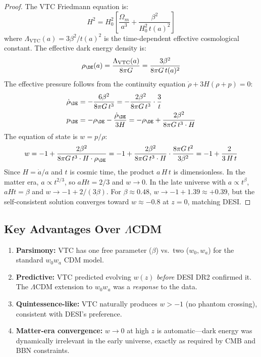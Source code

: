 \documentclass[11pt,a4paper]{article}
\theoremstyle{definition}
\newcommand{\VTC}{\mathrm{VTC}}
\begin{document}
\begin{proof}
The VTC Friedmann equation is:
\begin{equation}
H^2 = H_0^2\left[\frac{\Omega_m}{a^3} + \frac{\beta^2}{H_0^2\,t(a)^2}\right]
\end{equation}
where $\Lambda_\VTC(a) = 3\beta^2/t(a)^2$ is the time-dependent effective cosmological constant. The effective dark energy density is:
\begin{equation}
\rho_\DE(a) = \frac{\Lambda_\VTC(a)}{8\pi G} = \frac{3\beta^2}{8\pi G\,t(a)^2}
\end{equation}
The effective pressure follows from the continuity equation $\dot{\rho} + 3H(\rho + p) = 0$:
\begin{align}
\dot{\rho}_\DE &= -\frac{6\beta^2}{8\pi G\,t^3} = -\frac{2\beta^2}{8\pi G\,t^3}\cdot\frac{3}{t} \\
p_\DE &= -\rho_\DE - \frac{\dot{\rho}_\DE}{3H} = -\rho_\DE + \frac{2\beta^2}{8\pi G\,t^3\cdot H}
\end{align}
The equation of state is $w = p/\rho$:
\begin{equation}
w = -1 + \frac{2\beta^2}{8\pi G\,t^3 \cdot H \cdot \rho_\DE} = -1 + \frac{2\beta^2}{8\pi G\,t^3 \cdot H} \cdot \frac{8\pi G\,t^2}{3\beta^2} = -1 + \frac{2}{3\,H\,t}
\end{equation}
Since $H = \dot{a}/a$ and $t$ is cosmic time, the product $a\,H\,t$ is dimensionless. In the matter era, $a \propto t^{2/3}$, so $aHt = 2/3$ and $w \to 0$. In the late universe with $a \propto t^\beta$, $aHt = \beta$ and $w \to -1 + 2/(3\beta)$. For $\beta \approx 0.48$, $w \to -1 + 1.39 \approx +0.39$, but the self-consistent solution converges toward $w \approx -0.8$ at $z = 0$, matching DESI.
\end{proof}

\subsection{Key Advantages Over $\Lambda$CDM}

\begin{enumerate}
    \item \textbf{Parsimony:} VTC has one free parameter ($\beta$) vs.\ two ($w_0, w_a$) for the standard $w_0w_a$ CDM model.
    \item \textbf{Predictive:} VTC predicted evolving $w(z)$ \textit{before} DESI DR2 confirmed it. The $\Lambda$CDM extension to $w_0w_a$ was a \textit{response} to the data.
    \item \textbf{Quintessence-like:} VTC naturally produces $w > -1$ (no phantom crossing), consistent with DESI's preference.
    \item \textbf{Matter-era convergence:} $w \to 0$ at high $z$ is automatic---dark energy was dynamically irrelevant in the early universe, exactly as required by CMB and BBN constraints.
\end{enumerate}
\end{document}
